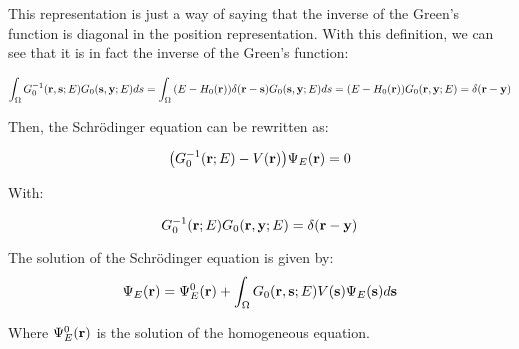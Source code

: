 This representation is just a way of saying that the inverse of the Green's function is diagonal in the position representation. With this definition, we can see that it is in fact the inverse of the Green's function:

\begin{equation}
    \int_\Omega G_0^{-1}(\vb r,\vb s;E)G_0(\vb s,\vb y;E)ds=\int_\Omega \qty(E-H_0(\vb r))\delta(\vb r-\vb s)G_0(\vb s,\vb y;E)ds=\qty(E-H_0(\vb r))G_0(\vb r,\vb y;E)=\delta(\vb r-\vb y)
\end{equation}

Then, the Schrödinger equation can be rewritten as:

\begin{equation}\label{eq:schrod_eq_green}
    \qty(G_0^{-1}(\vb r;E)-V(\vb r)){\Psi_E(\vb r)}=0
\end{equation}

With:

\begin{equation}\label{eq:inverse_green}
    G_0^{-1}(\vb r;E)G_0(\vb r,\vb y;E)=\delta(\vb r-\vb y)
\end{equation}

\begin{proposition}
    The solution of the Schrödinger equation is given by:
    \begin{equation}\label{eq:schrod_eq_sol}
        \Psi_E(\vb r)=\Psi_E^0(\vb r)+\int_\Omega G_0(\vb r,\vb s;E)V(\vb s){\Psi_E(\vb s)}d\vb s
    \end{equation}

    Where $\Psi_E^0(\vb r)$ is the solution of the homogeneous equation.
\end{proposition}

